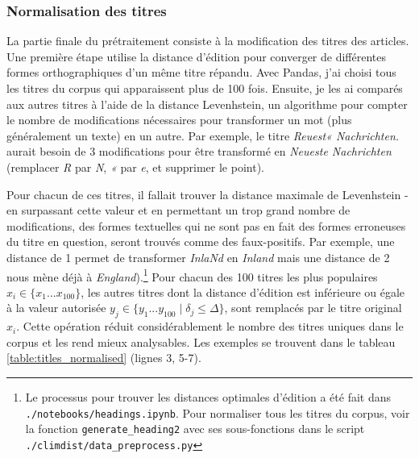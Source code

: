 \documentclass[a4paper,twoside,12pt]{article}
\begin{document}
\subsubsection{Normalisation des titres} \label{normalisation_titres}

La partie finale du prétraitement consiste à la modification des titres des articles. Une première étape utilise la distance d'édition pour converger de différentes formes orthographiques d'un même titre répandu. Avec Pandas, j'ai choisi tous les titres du corpus qui apparaissent plus de 100 fois. Ensuite, je les ai comparés aux autres titres à l'aide de la distance Levenhstein, un algorithme pour compter le nombre de modifications nécessaires pour transformer un mot (plus généralement un texte) en un autre. Par exemple, le titre \textit{Reuest« Nachrichten.} aurait besoin de 3 modifications pour être transformé en \textit{Neueste Nachrichten} (remplacer \textit{R} par \textit{N}, \textit{«} par \textit{e}, et supprimer le point).

Pour chacun de ces titres, il fallait trouver la distance maximale de Levenhstein - en surpassant cette valeur et en permettant un trop grand nombre de modifications, des formes textuelles qui ne sont pas en fait des formes erroneuses du titre en question, seront trouvés comme des faux-positifs. Par exemple, une distance de 1 permet de transformer \textit{InlaNd} en \textit{Inland} mais une distance de 2 nous mène déjà à \textit{England}).\footnote{Le processus pour trouver les distances optimales d'édition a été fait dans \newline \texttt{./notebooks/headings.ipynb}. Pour normaliser tous les titres du corpus, voir la fonction \newline \texttt{generate\_heading2} avec ses sous-fonctions dans le script \texttt{./climdist/data\_preprocess.py}} Pour chacun des 100 titres les plus populaires \(x_i \in \{x_1 ... x_{100}\}\), les autres titres dont la distance d'édition est inférieure ou égale à la valeur autorisée \(y_j \in \{y_1 ... y_{100} \mid \delta_j \le \Delta\}\), sont remplacés par le titre original \(x_i\). Cette opération réduit considérablement le nombre des titres uniques dans le corpus et les rend mieux analysables. Les exemples se trouvent dans le tableau \ref{table:titles_normalised} (lignes 3, 5-7).
\end{document}
